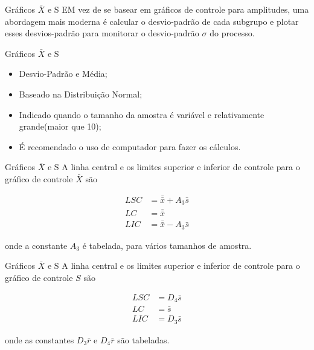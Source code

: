 \documentclass[12pt]{beamer}
\begin{document}
  \begin{frame}[t]{Gráficos $\bar X$ e S}
    EM vez de se basear em gráficos de controle para amplitudes, uma abordagem mais moderna é calcular o desvio-padrão de cada subgrupo e plotar esses desvios-padrão para monitorar o desvio-padrão $\sigma$ do processo.
  \end{frame}

  \begin{frame}[t]{Gráficos $\bar X$ e S}
    \begin{itemize}
      \item Desvio-Padrão e Média;

      \item Baseado na Distribuição Normal;

      \item Indicado quando o tamanho da amostra é variável e relativamente grande(maior que 10);

      \item É recomendado o uso de computador para fazer os cálculos.
    \end{itemize}
  \end{frame}

  \begin{frame}[t]{Gráficos $\bar X$ e S}
    A linha central e os limites superior e inferior de controle para o gráfico de controle $\bar X$ são

    \begin{align*}
      LSC & = \bar{\bar x} + A_{3}{\bar{s}}\\
      LC & = \bar{\bar x}\\
      LIC & = \bar{\bar x} - A_{3}{\bar{s}}
    \end{align*}

    onde a constante $A_{3}$ é tabelada, para vários tamanhos de amostra.
  \end{frame}

  \begin{frame}[t]{Gráficos $\bar X$ e S}
    A linha central e os limites superior e inferior de controle para o gráfico de controle $S$ são

    \begin{align*}
      LSC & = D_4 \bar s\\
      LC & = \bar s\\
      LIC & = D_3 \bar s
    \end{align*}

    onde as constantes $D_3 \bar r$ e $D_4 \bar r$ são tabeladas.
  \end{frame}
\end{document}
